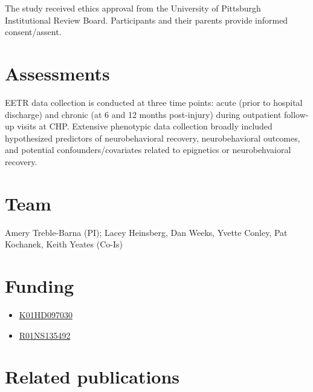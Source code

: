 \documentclass[
  letterpaper,
  DIV=11,
  numbers=noendperiod]{scrreprt}
\providecommand{\tightlist}{%
  \setlength{\itemsep}{0pt}\setlength{\parskip}{0pt}}\usepackage{longtable,booktabs,array}
\begin{document}

The study received ethics approval from the University of Pittsburgh
Institutional Review Board. Participants and their parents provide
informed consent/assent.

\section*{Assessments}\label{assessments-3}


EETR data collection is conducted at three time points: acute (prior to
hospital discharge) and chronic (at 6 and 12 months post-injury) during
outpatient follow-up visits at CHP. Extensive phenotypic data collection
broadly included hypothesized predictors of neurobehavioral recovery,
neurobehavioral outcomes, and potential confounders/covariates related
to epignetics or neurobehvaioral recovery.

\section*{Team}\label{team-3}


Amery Treble-Barna (PI); Lacey Heinsberg, Dan Weeks, Yvette Conley, Pat
Kochanek, Keith Yeates (Co-Is)

\section*{Funding}\label{funding-3}


\begin{itemize}
\tightlist
\item
  \href{https://reporter.nih.gov/search/IEeSkSd_70aDzwz6FxIMDA/project-details/10678647}{K01HD097030}
\item
  \href{https://reporter.nih.gov/search/IEeSkSd_70aDzwz6FxIMDA/project-details/10980135}{R01NS135492}
\end{itemize}

\section*{Related publications}\label{related-publications-3}
\end{document}
